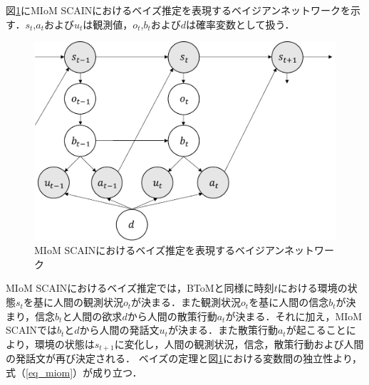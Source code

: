 \par
図\ref{fig:miom}にMIoM SCAINにおけるベイズ推定を表現するベイジアンネットワークを示す．$s_t$,$a_t$および$u_t$は観測値，$o_t$,$b_t$および$d$は確率変数として扱う．
\begin{figure}[htbp]
  \begin{center}
    \includegraphics[scale=0.7]{./miom.pdf}
    \caption{MIoM SCAINにおけるベイズ推定を表現するベイジアンネットワーク}
    \label{fig:miom}
  \end{center}
\end{figure}
MIoM SCAINにおけるベイズ推定では，BToMと同様に時刻$t$における環境の状態$s_{t}$を基に人間の観測状況$o_{t}$が決まる．また観測状況$o_{t}$を基に人間の信念$b_{t}$が決まり，信念$b_{t}$と人間の欲求$d$から人間の散策行動$a_{t}$が決まる．それに加え，MIoM SCAINでは$b_t$と$d$から人間の発話文$u_t$が決まる．また散策行動$a_{t}$が起こることにより，環境の状態は$s_{t+1}$に変化し，人間の観測状況，信念，散策行動および人間の発話文が再び決定される．
ベイズの定理と図\ref{fig:miom}における変数間の独立性より，式（\ref{eq_miom}）が成り立つ．

